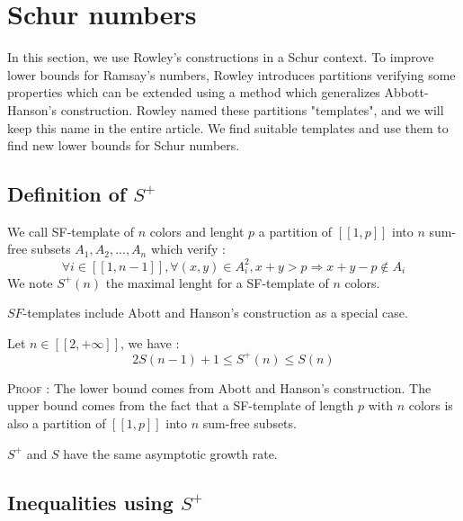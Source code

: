 \section{Schur numbers}

\qquad In this section, we use Rowley's constructions \cite{RowleyRamsey} in a Schur context. To improve lower bounds
for Ramsay's
numbers, Rowley
introduces partitions verifying some properties which can be extended using a method which generalizes Abbott-Hanson's
\cite{AbbottHanson} construction.
Rowley named these partitions "templates", and we will keep this name in the entire article. We find suitable templates
and use them
 to find new lower bounds for Schur numbers.

\subsection{Definition of \(S^+\)}

\begin{definition}
We call SF-template of \(n\) colors and lenght \(p\) a partition of \( [\![1,p]\!]\) into \(n\) sum-free subsets \(A_1,
A_2, ..., A_n\) which verify :
	\[
	\forall i \in [\![1, n-1]\!], \forall (x,y) \in A_i^2, x+y > p
	\Longrightarrow x+y-p \notin A_i
	\]
	We note \(S^+(n)\) the maximal lenght for a SF-template of \(n\) colors.
\end{definition}

\begin{remark}
	\(SF\)-templates include Abott and Hanson's construction \cite{AbbottHanson} as a special case.
\end{remark}

\begin{proposition}
	Let \(n \in [\![2, +\infty]\!]\), we have :
	\[
	2S(n-1)+1 \leqslant S^+(n) \leqslant S(n)
	\]
\end{proposition}

\textsc{Proof :} The lower bound comes from Abott and Hanson's construction. The upper bound comes
from the fact that a SF-template of length \(p\) with \(n\) colors is also a partition of
\([\![1, p]\!]\) into \(n\) sum-free subsets.

\begin{remark}
	\(S^+\) and \(S\) have the same asymptotic growth rate.
\end{remark}


\subsection{Inequalities using \(S^+\)}

